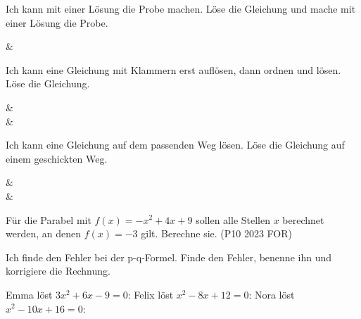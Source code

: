\begin{aufgabe}{Ich kann mit einer Lösung die Probe machen.}
Löse die Gleichung und mache mit einer Lösung die Probe.
\begin{gleichungsraster}[5]
 &  \\
\end{gleichungsraster}
\end{aufgabe}


\begin{aufgabe}{Ich kann eine Gleichung mit Klammern erst auflösen, dann ordnen und lösen.}
Löse die Gleichung.
\begin{gleichungsraster}[5]
 &  \\
 & \\
\end{gleichungsraster}
\end{aufgabe}


\begin{aufgabe}{Ich kann eine Gleichung auf dem passenden Weg lösen.}
Löse die Gleichung auf einem geschickten Weg.
\begin{gleichungsraster}[3]
 &  \\
 &  \\
\end{gleichungsraster}
\begin{teile}
\teil Für die Parabel mit $f(x) = -x^2 + 4x + 9$ sollen alle Stellen $x$ berechnet werden, an denen $f(x) = -3$ gilt. Berechne sie. (P10 2023 FOR) \hfill {} \quad {}
\end{teile}
\end{aufgabe}

\begin{aufgabe}{Ich finde den Fehler bei der p-q-Formel.}
Finde den Fehler, benenne ihn und korrigiere die Rechnung.
\begin{teile}
\teil Emma löst $3x^2 + 6x - 9 = 0$:
\teil Felix löst $x^2 - 8x + 12 = 0$:
\teil Nora löst $x^2 - 10x + 16 = 0$:
\end{teile}
\end{aufgabe}

